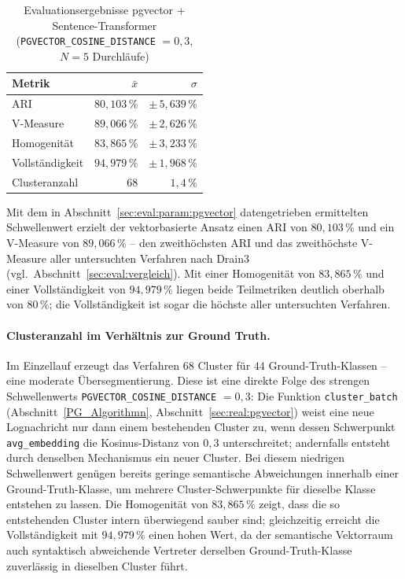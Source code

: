 \begin{table}[h]
    \centering
    \caption{Evaluationsergebnisse pgvector + Sentence-Transformer
             (\texttt{PGVECTOR\_COSINE\_DISTANCE} $= 0{,}3$, $N = 5$ Durchläufe)}
    \label{tab:eval:pgvector}
    \begin{tabular}{lrr}
        \toprule
        Metrik & $\bar{x}$ & $\sigma$ \\
        \midrule
        ARI            & $80{,}103\,\%$ & $\pm\,5{,}639\,\%$ \\
        V-Measure      & $89{,}066\,\%$ & $\pm\,2{,}626\,\%$ \\
        Homogenität    & $83{,}865\,\%$ & $\pm\,3{,}233\,\%$ \\
        Vollständigkeit& $94{,}979\,\%$ & $\pm\,1{,}968\,\%$ \\
        \midrule
        Clusteranzahl  & $68$ & $1{,}4\,\%$ \\
        \bottomrule
    \end{tabular}
\end{table}

Mit dem in Abschnitt~\ref{sec:eval:param:pgvector} datengetrieben ermittelten
Schwellenwert erzielt der vektorbasierte Ansatz einen ARI von $80{,}103\,\%$
und ein V-Measure von $89{,}066\,\%$ -- den zweithöchsten ARI und das
zweithöchste V-Measure aller untersuchten Verfahren nach Drain3 (vgl.\
Abschnitt~\ref{sec:eval:vergleich}). Mit einer Homogenität von $83{,}865\,\%$
und einer Vollständigkeit von $94{,}979\,\%$ liegen beide Teilmetriken
deutlich oberhalb von $80\,\%$; die Vollständigkeit ist sogar die höchste
aller untersuchten Verfahren.

\paragraph{Clusteranzahl im Verhältnis zur Ground Truth.}
Im Einzellauf erzeugt das Verfahren $68$ Cluster für $44$ Ground-Truth-Klassen
-- eine moderate Übersegmentierung. Diese ist eine direkte Folge des
strengen Schwellenwerts \texttt{PGVECTOR\_COSINE\_DISTANCE} $= 0{,}3$: Die
Funktion \texttt{cluster\_batch} (Abschnitt~\ref{PG_Algorithmn},
Abschnitt~\ref{sec:real:pgvector}) weist eine neue Lognachricht nur dann
einem bestehenden Cluster zu, wenn dessen Schwerpunkt
\texttt{avg\_embedding} die Kosinus-Distanz von $0{,}3$ unterschreitet;
andernfalls entsteht durch denselben Mechanismus ein neuer Cluster. Bei
diesem niedrigen Schwellenwert genügen bereits geringe semantische
Abweichungen innerhalb einer Ground-Truth-Klasse, um mehrere
Cluster-Schwerpunkte für dieselbe Klasse entstehen zu lassen. Die
Homogenität von $83{,}865\,\%$ zeigt, dass die so entstehenden Cluster
intern überwiegend sauber sind; gleichzeitig erreicht die Vollständigkeit
mit $94{,}979\,\%$ einen hohen Wert, da der semantische Vektorraum auch
syntaktisch abweichende Vertreter derselben Ground-Truth-Klasse
zuverlässig in dieselben Cluster führt.

